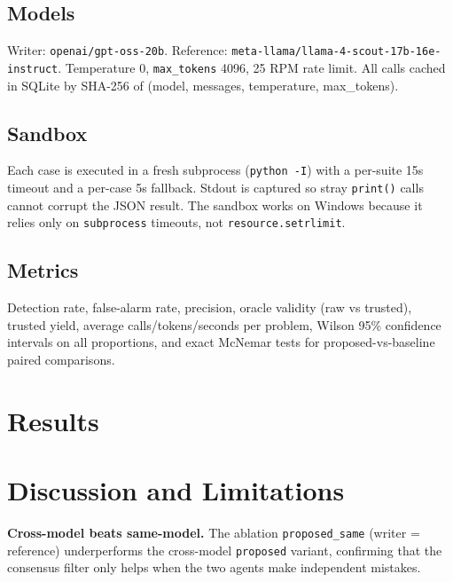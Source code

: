 \documentclass[conference]{IEEEtran}
\begin{document}
\subsection{Models}
Writer: \texttt{openai/gpt-oss-20b}. Reference:
\texttt{meta-llama/llama-4-scout-17b-16e-instruct}. Temperature 0,
\texttt{max\_tokens} 4096, 25 RPM rate limit. All calls cached in SQLite by
SHA-256 of (model, messages, temperature, max\_tokens).

\subsection{Sandbox}
Each case is executed in a fresh subprocess (\texttt{python -I}) with a
per-suite 15s timeout and a per-case 5s fallback. Stdout is captured so
stray \texttt{print()} calls cannot corrupt the JSON result. The sandbox
works on Windows because it relies only on \texttt{subprocess} timeouts, not
\texttt{resource.setrlimit}.

\subsection{Metrics}
Detection rate, false-alarm rate, precision, oracle validity (raw vs trusted),
trusted yield, average calls/tokens/seconds per problem, Wilson 95\%
confidence intervals on all proportions, and exact McNemar tests for
proposed-vs-baseline paired comparisons.

\section{Results}
% 


\section{Discussion and Limitations}
\textbf{Cross-model beats same-model.} The ablation
\texttt{proposed\_same} (writer = reference) underperforms the cross-model
\texttt{proposed} variant, confirming that the consensus filter only helps
when the two agents make independent mistakes.
\end{document}

